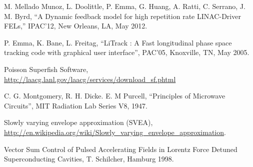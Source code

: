 \documentclass[a4paper,12pt]{article}
\begin{document}
\begin{thebibliography}{19}   %

M. Mellado Munoz, L. Doolittle, P. Emma, G. Huang, A. Ratti, C. Serrano, J. M. Byrd, ``A Dynamic feedback model for high repetition rate LINAC-Driver FELs,''
IPAC'12, New Orleans, LA, May 2012.

P. Emma, K. Bane, L. Freitag, ``LiTrack : A Fast longitudinal phase space tracking code with graphical user interface'', PAC'05,  Knoxville, TN, May 2005.

Poisson Superfish Software, \url{http://laacg.lanl.gov/laacg/services/download_sf.phtml}

C. G. Montgomery, R. H. Dicke. E. M Purcell, ``Principles of Microwave Circuits'', MIT Radiation Lab Series V8, 1947.

Slowly varying envelope approximation (SVEA), \url{http://en.wikipedia.org/wiki/Slowly_varying_envelope_approximation}.

Vector Sum Control of Pulsed Accelerating Fields in Lorentz Force Detuned Superconducting Cavities, T. Schilcher, Hamburg 1998.


\end{thebibliography}
\end{document}
